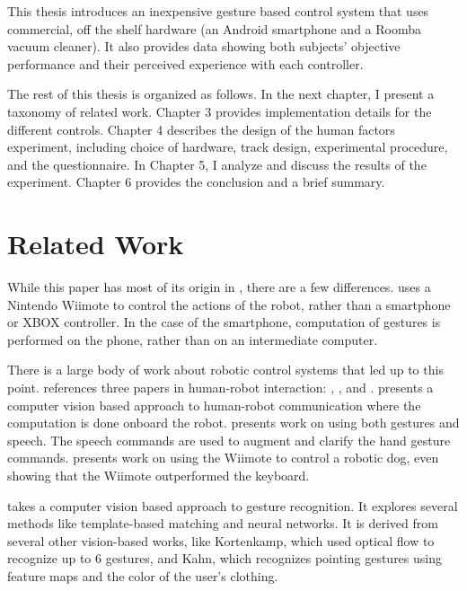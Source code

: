 \documentclass[12pt,a4paper]{report}
\begin{document}
This thesis introduces an inexpensive gesture based control system that uses commercial, off the shelf hardware (an Android smartphone and a Roomba vacuum cleaner). It also provides data showing both subjects' objective performance and their perceived experience with each controller.

The rest of this thesis is organized as follows. In the next chapter, I present a taxonomy of related work. Chapter 3 provides implementation details for the different controls. Chapter 4 describes the design of the human factors experiment, including choice of hardware, track design, experimental procedure, and the questionnaire. In Chapter 5, I analyze and discuss the results of the experiment. Chapter 6 provides the conclusion and a brief summary. 

\chapter{Related Work}
While this paper has most of its origin in \cite{Varcholik_Barber_Nicholson_2008}, there are a few differences. \cite{Varcholik_Barber_Nicholson_2008} uses a Nintendo Wiimote to control the actions of the robot, rather than a smartphone or XBOX controller. In the case of the smartphone, computation of gestures is performed on the phone, rather than on an intermediate computer.

There is a large body of work about robotic control systems that led up to this point.  \cite{Varcholik_Barber_Nicholson_2008} references three papers in human-robot interaction: \cite{Waldherr}, \cite{Rogalla}, and \cite{Guo}. \cite{Waldherr} presents a computer vision based approach to human-robot communication where the computation is done onboard the robot. \cite{Rogalla} presents work on using both gestures and speech. The speech commands are used to augment and clarify the hand gesture commands. \cite{Guo} presents work on using the Wiimote to control a robotic dog, even showing that the Wiimote
outperformed the keyboard.

\cite{Waldherr} takes a computer vision based approach to gesture recognition. It explores several methods like template-based matching and neural networks. It is derived from several other vision-based works, like Kortenkamp, which used optical flow to recognize up to 6 gestures, and Kahn, which recognizes pointing gestures using feature maps and the color of the user's clothing.
\end{document}
